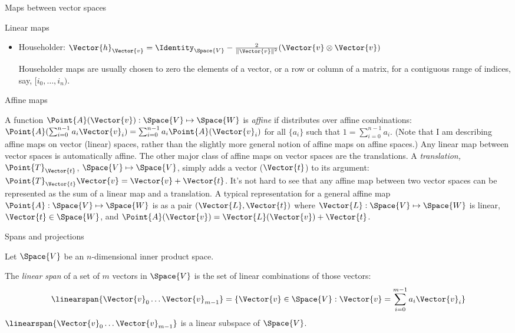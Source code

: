 \begin{plSection}{Maps between vector spaces}
\begin{plSection}{Linear maps}
\begin{itemize}
\item Householder:
$\Vector{h}_{\Vector{v}} = \Identity_{\Space{V}} - \frac{2}{\| \Vector{v} \|^2} (\Vector{v} \otimes \Vector{v})$

Householder maps are usually chosen to zero the elements of
a vector, or a row or column of a matrix, for a contiguous range of
indices, say, $[i_0,\ldots,i_n)$.

\end {itemize}

\end{plSection}%
\begin{plSection}{Affine maps}
\label{sec:affine-maps}

A function $\Point{A}(\Vector{v}):\Space{V} \mapsto \Space{W}$
is {\it affine} if distributes over affine combinations:
$\Point{A}(\sum_{i=0}^{n-1} a_i \Vector{v}_i) = \sum_{i=0}^{n-1} a_i \Point{A}(\Vector{v}_i) $
for all $\{a_i\}$ such that $1 = \sum_{i=0}^{n-1} a_i$.
(Note that I am describing affine maps on vector (linear) spaces,
rather than the slightly more general notion of affine maps on affine spaces.)
Any linear map between vector spaces is automatically affine.
The other major class of affine maps on vector spaces are the translations.
A {\it translation,} 
$\Point{T}_{\Vector{t}}$, $\Space{V} \mapsto \Space{V}$,
simply adds a vector ($\Vector{t}$) to its argument:
$\Point{T}_{\Vector{t}} \Vector{v} = \Vector{v} + \Vector{t}$.
It's not hard to see that any affine map between two vector spaces
can be represented as the sum of a linear map and a translation.
A typical representation for a general affine map 
$\Point{A} : \Space{V} \mapsto \Space{W}$
is as a pair $(\Vector{L},\Vector{t})$ where 
$\Vector{L} : \Space{V} \mapsto \Space{W}$ is linear,
$\Vector{t} \in \Space{W}$, and $\Point{A}(\Vector{v}) = 
\Vector{L}(\Vector{v}) + \Vector{t}$.

\end{plSection}%
\begin{plSection}{Spans and projections}
\label{sec:spans-and-projections}

Let $\Space{V}$ be an $n$-dimensional inner product space.

The {\it linear span} of a set of $m$ vectors in $\Space{V}$
is the set of linear combinations of those vectors:
\begin{equation}
\linearspan\{ \Vector{v}_0 \ldots \Vector{v}_{m-1} \} 
= \{\Vector{v} \in \Space{V} : \Vector{v} = \sum_{i=0}^{m-1} a_i \Vector{v}_i\}
\end{equation}
$\linearspan\{ \Vector{v}_0 \ldots \Vector{v}_{m-1} \}$ 
is a linear subspace of $\Space{V}$.


\end{plSection}
\end{plSection}
